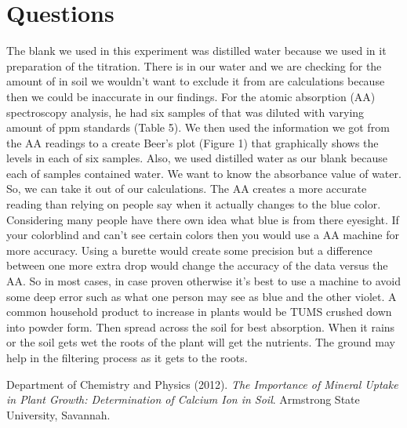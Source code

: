\documentclass[10pt]{article}
\begin{document}
\section{Questions}
\hspace{5ex} The blank we used in this experiment was distilled water because we used in it preparation of the titration. There is  in our water and we are checking for the amount of  in soil we wouldn't want to exclude it from are calculations because then we could be inaccurate in our findings. For the atomic absorption (AA) spectroscopy analysis, he had six samples of  that was diluted with varying amount of ppm standards (Table 5). We then used the information we got from the AA readings to a create Beer's plot (Figure 1) that graphically shows the  levels in each of six samples. Also, we used distilled water as our blank because each of samples contained water. We want to know the absorbance value of water. So, we can take it out of our calculations. The AA creates a more accurate reading than relying on people say when it actually changes to the blue color. Considering many people have there own idea what blue is from there eyesight. If your colorblind and can't see certain colors then you would use a AA machine for more accuracy. Using a burette would create some precision but a difference between one more extra drop would change the accuracy of the data versus the AA. So in most cases, in case proven otherwise it's best to use a machine to avoid some deep error such as what one person may see as blue and the other violet. A common household product to increase  in plants would be TUMS crushed down into powder form. Then spread across the soil for best absorption. When it rains or the soil gets wet the roots of the plant will get the nutrients. The ground may help in the filtering process as it gets to the roots.

\begin{thebibliography}{1}
Department of Chemistry and Physics (2012). \textit{The Importance of Mineral Uptake in Plant Growth: Determination of Calcium Ion in Soil}. Armstrong State University, Savannah.
\end{thebibliography}
\end{document}
